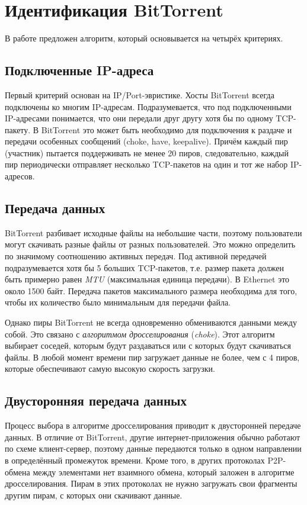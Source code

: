\documentclass[bachelor, och, coursework]{SCWorks}
\begin{document}
\section{Идентификация BitTorrent}
В работе \cite{bittorrent} предложен алгоритм, который основывается на четырёх критериях.

\subsection{Подключенные IP-адреса}
Первый критерий основан на IP/Port-эвристике. Хосты BitTorrent всегда подключены ко многим IP-адресам.
Подразумевается, что под подключенными IP-адресами понимается, что они передали друг другу хотя бы
по одному TCP-пакету. В BitTorrent это может быть необходимо для подключения к раздаче и передачи особенных
сообщений (choke, have, keepalive). Причём каждый пир (участник) пытается поддерживать не менее 20 пиров, следовательно,
каждый пир периодически отправляет несколько TCP-пакетов на один и тот же набор IP-адресов.

\subsection{Передача данных}
BitTorrent разбивает исходные файлы на небольшие части, поэтому пользователи могут скачивать разные файлы
от разных пользователей. Это можно определить по значимому соотношению активных передач. Под активной передачей
подразумевается хотя бы 5 больших TCP-пакетов, т.е. размер пакета должен быть примерно равен \textit{MTU} (максимальная единица передачи). В Ethernet это около 1500 байт. Передача пакетов максимального размера необходима для того, 
чтобы их количество было минимальным для передачи файла.

Однако пиры BitTorrent не всегда одновременно обмениваются данными между собой. 
Это связано с \textit{алгоритмом дросселирования} (\textit{choke}). Этот алгоритм выбирает соседей, которым будут раздаваться или с которых будут скачиваться файлы. В любой момент времени пир загружает данные не более, чем 
с 4 пиров, которые обеспечивают самую высокую скорость загрузки. %
 
\subsection{Двусторонняя передача данных}
Процесс выбора в алгоритме дросселирования приводит к двусторонней передаче данных. В отличие от BitTorrent, другие 
интернет-приложения обычно работают по схеме клиент-сервер, поэтому данные передаются только в одном направлении в 
определённый промежуток времени. Кроме того, в других протоколах P2P-обмена между элементами нет взаимного обмена,
который заложен в алгоритме дросселирования. Пирам в этих протоколах не нужно загружать свои фрагменты другим пирам,
с которых они скачивают данные. 
\end{document}
